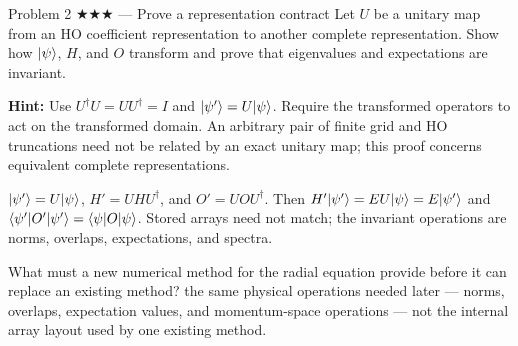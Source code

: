 \documentclass[11pt]{article}
\begin{document}
\begin{problem}{Problem 2 ★★★ — Prove a representation contract}
Let $U$ be a unitary map from an HO coefficient representation to another
complete representation. Show how $\lvert \psi\rangle$, $H$, and $O$ transform and prove
that eigenvalues and expectations are invariant.

\textbf{Hint:} Use $U^\dagger U=UU^\dagger=I$ and
$\lvert \psi'\rangle=U\lvert \psi\rangle$. Require the transformed operators to act on the
transformed domain. An arbitrary pair of finite grid and HO truncations need
not be related by an exact unitary map; this proof concerns equivalent complete
representations.
\end{problem}
\begin{solution}
$\lvert \psi'\rangle=U\lvert \psi\rangle$, $H'=UHU^\dagger$, and $O'=UOU^\dagger$. Then
$H'\lvert \psi'\rangle=EU\lvert \psi\rangle=E\lvert \psi'\rangle$ and
$\langle \psi'\rvert O'\lvert \psi'\rangle=\langle \psi\rvert O\lvert \psi\rangle$. Stored arrays need not match;
the invariant operations are norms, overlaps, expectations, and spectra.
\end{solution}
\begin{quiz}
What must a new numerical method for the radial equation provide before it can
replace an existing method? \answer the same physical operations needed later
--- norms, overlaps, expectation values, and momentum-space operations --- not
the internal array layout used by one existing method.
\end{quiz}
\end{document}
